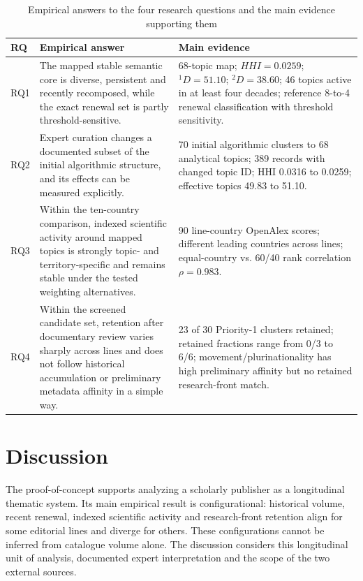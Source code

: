\documentclass[futureinternet,article,submit,moreauthors]{Definitions/mdpi}
\begin{document}
\begin{table}[htbp]
\caption{Empirical answers to the four research questions and the main evidence supporting them}\label{tab:rqanswers}
\small
\begin{tabularx}{\textwidth}{@{}p{}Y Y@{}}
\toprule
RQ & Empirical answer & Main evidence \\
\midrule
RQ1 & The mapped stable semantic core is diverse, persistent and recently recomposed, while the exact renewal set is partly threshold-sensitive. & 68-topic map; $HHI=0.0259$; ${}^{1}D=51.10$; ${}^{2}D=38.60$; 46 topics active in at least four decades; reference 8-to-4 renewal classification with threshold sensitivity. \\
RQ2 & Expert curation changes a documented subset of the initial algorithmic structure, and its effects can be measured explicitly. & 70 initial algorithmic clusters to 68 analytical topics; 389 records with changed topic ID; HHI 0.0316 to 0.0259; effective topics 49.83 to 51.10. \\
RQ3 & Within the ten-country comparison, indexed scientific activity around mapped topics is strongly topic- and territory-specific and remains stable under the tested weighting alternatives. & 90 line-country OpenAlex scores; different leading countries across lines; equal-country vs. 60/40 rank correlation $\rho=0.983$. \\
RQ4 & Within the screened candidate set, retention after documentary review varies sharply across lines and does not follow historical accumulation or preliminary metadata affinity in a simple way. & 23 of 30 Priority-1 clusters retained; retained fractions range from 0/3 to 6/6; movement/plurinationality has high preliminary affinity but no retained research-front match. \\
\bottomrule
\end{tabularx}
\end{table}

\section{Discussion}\label{sec:discussion}

The proof-of-concept supports analyzing a scholarly publisher as a longitudinal thematic system. Its main empirical result is configurational: historical volume, recent renewal, indexed scientific activity and research-front retention align for some editorial lines and diverge for others. These configurations cannot be inferred from catalogue volume alone. The discussion considers this longitudinal unit of analysis, documented expert interpretation and the scope of the two external sources.
\end{document}
